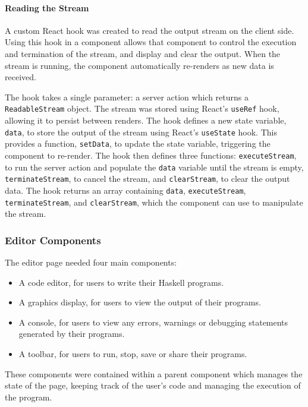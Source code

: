 \documentclass[../main.tex]{subfiles}
\begin{document}
                \paragraph{Reading the Stream}
                    A custom React hook was created to read the output stream on the client side.
                    Using this hook in a component allows that component to control the execution
                        and termination of the stream, and display and clear the output.
                    When the stream is running, the component automatically re-renders as new data
                        is received.

                    The hook takes a single parameter: a server action which returns a
                        \texttt{ReadableStream} object.
                    The stream was stored using React's \texttt{useRef} hook, allowing it to
                        persist between renders.
                    The hook defines a new state variable, \texttt{data}, to store the output of
                        the stream using React's \texttt{useState} hook.
                    This provides a function, \texttt{setData}, to update the state variable,
                        triggering the component to re-render.
                    The hook then defines three functions: \texttt{executeStream}, to run the
                        server action and populate the \texttt{data} variable until the stream is
                        empty, \texttt{terminateStream}, to cancel the stream, and
                        \texttt{clearStream}, to clear the output data.
                    The hook returns an array containing \texttt{data}, \texttt{executeStream},
                        \texttt{terminateStream}, and \texttt{clearStream}, which the component can use
                        to manipulate the stream.

            \subsubsection{Editor Components}
                The editor page needed four main components:
                \begin{itemize}
                    \item A code editor, for users to write their Haskell programs.
                    \item A graphics display, for users to view the output of their programs.
                    \item A console, for users to view any errors, warnings or debugging statements
                          generated by their programs.
                    \item A toolbar, for users to run, stop, save or share their programs.
                \end{itemize}
                These components were contained within a parent component which manages the
                    state of the page, keeping track of the user's code and managing the execution
                    of the program.
\end{document}
